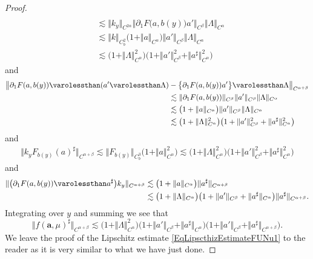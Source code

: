 \documentclass[JEP,XML,SOM,Unicode,published]{cedram}
\theoremstyle{definition}
\newcommand{\bsa}{\boldsymbol{a}}
\newcommand{\norme}[1]{\Vert #1 \Vert}
\begin{document}
\begin{proof}
\begin{equation*}
\begin{split}
\\
&\lesssim \norme{k_y}_{C^{2\alpha}}\norme{\partial_1 F\bigl(a, b(y)\bigr) a'}_{C^\beta} \norme{\Lambda}_{C^\alpha}
\\
&\lesssim \norme{k}_{C^2_b}\bigl(1+\norme{a}_{C^\alpha}\bigr)\norme{a'}_{C^\beta}\norme{\Lambda}_{C^\alpha}
\\
&\lesssim \bigl(1+\norme{\Lambda}^2_{C^\alpha}\bigr) \bigl(1+\norme{a'}^2_{C^\beta} + \Vert a^\sharp\Vert^2_{C^\alpha} \bigr)
\end{split} \end{equation*}
and
\begin{equation*} \begin{split}
\big\Vert \partial_1F(a, b(y)) \varolessthan (a' \varolessthan \Lambda) &- \bigl\{ \partial_1F(a, b(y)) a'\bigr\} \varolessthan \Lambda \big\Vert_{C^{\alpha+\beta}} \\
&\lesssim \norme{\partial_1 F(a, b(y))}_{C^\beta} \norme{a'}_{C^\beta}\norme{\Lambda}_{C^\alpha} \\
&\lesssim \bigl(1+\norme{a}_{C^\alpha}\bigr) \norme{a'}_{C^\beta}\norme{\Lambda}_{C^\alpha} \\
&\lesssim \bigl(1+\norme{\Lambda}^2_{C^\alpha}\bigr) \bigl(1+\norme{a'}^2_{C^\beta} + \Vert a^\sharp\Vert^2_{C^\alpha} \bigr)
\end{split} \end{equation*}
and
\begin{equation*} \begin{split}
\norme{k_y F_{b(y)}(a)^\sharp}_{C^{\alpha+\beta}} \lesssim \norme{F_{b(y)}}_{C^3_b}\bigl(1+\norme{a}_{C^\alpha}^2\bigr) \lesssim \bigl(1+\norme{\Lambda}^2_{C^\alpha}\bigr)\bigl(1+\norme{a'}^2_{C^\beta} + \Vert a^\sharp\Vert_{C^\alpha}^2\bigr)
\end{split} \end{equation*}
and
\begin{equation*} \begin{split}
\norme{ \bigl(\partial_1 F(a, b(y)) \varolessthan a^\sharp \bigr) k_y}_{C^{\alpha+\beta}} &\lesssim \bigl(1+\norme{a}_{C^\alpha}\bigr) \Vert a^\sharp\Vert_{C^{\alpha+\beta}} \\
&\lesssim \bigl(1+\norme{\Lambda}_{C^\alpha}\bigr)\bigl(1+\norme{a'}_{C^\beta} + \Vert a^\sharp\Vert_{C^\alpha}\bigr) \Vert a^\sharp\Vert_{C^{\alpha+\beta}}.
\end{split} \end{equation*}
Integrating over $y$ and summing we see that
\[
\norme{f(\bsa,\mu)^\sharp}_{C^{\alpha+\beta}} \lesssim \bigl(1+\norme{\Lambda}_{C^\alpha}^2 \bigr)\bigl(1+\norme{a'}_{C^\beta} + \Vert a^\sharp\Vert_{C^\alpha} \bigr)\bigl(1+ \norme{a'}_{C^\beta} + \Vert a^\sharp\Vert_{C^{\alpha+\beta}} \bigr).
\]
We leave the proof of the Lipschitz estimate \eqref{EqLipscthizEstimateFUNu1} to the reader as it is very similar to what we have just done.
\end{proof}
\end{document}
